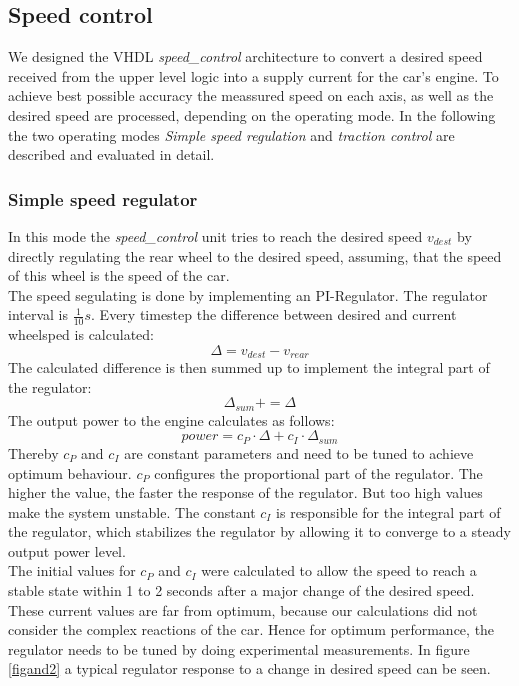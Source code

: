 \documentclass[a4paper
               ,10pt
               ,DIV=10 %
               ,BCOR=0.3cm
               ,pagesize %
               ,headings=small
               ,bibtotoc
               ]
               {scrartcl}
\begin{document}
\subsection{Speed control}
We designed the VHDL \emph{speed\_control} architecture to convert a desired speed received from the upper level logic into a supply current for the car's engine. To achieve best possible accuracy the meassured speed on each axis, as well as the desired speed are processed, depending on the operating mode. In the following the two operating modes \emph{Simple speed regulation} and \emph{traction control} are described and evaluated in detail.
\subsubsection{Simple speed regulator} \label{simplepi}
In this mode the \emph{speed\_control} unit tries to reach the desired speed $v_{dest}$ by directly regulating the rear wheel to the desired speed, assuming, that the speed of this wheel is the speed of the car.\\
The speed segulating is done by implementing an PI-Regulator. The regulator interval is $\frac{1}{10}s$. Every timestep the difference between desired and current wheelsped is calculated:
$$\Delta = v_{dest} - v_{rear}$$
The calculated difference is then summed up to implement the integral part of the regulator:
$$\Delta_{sum} += \Delta$$
The output power to the engine calculates as follows:
$$power = c_P \cdot \Delta + c_I \cdot \Delta_{sum}$$
Thereby $c_P$ and $c_I$ are constant parameters and need to be tuned to achieve optimum behaviour. $c_P$ configures the proportional part of the regulator. The higher the value, the faster the response of the regulator. But too high values make the system unstable. The constant $c_I$ is responsible for the integral part of the regulator, which stabilizes the regulator by allowing it to converge to a steady output power level.\\
The initial values for $c_P$ and $c_I$ were calculated to allow the speed to reach a stable state within 1 to 2 seconds after a major change of the desired speed. These current values are far from optimum, because our calculations did not consider the complex reactions of the car. Hence for optimum performance, the regulator needs to be tuned by doing experimental measurements. In figure \ref{figand2} a typical regulator response to a change in desired speed can be seen.
\end{document}
